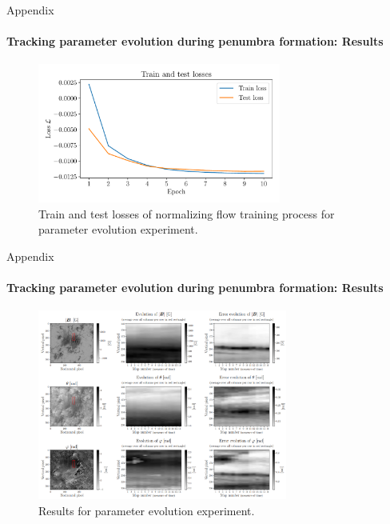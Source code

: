\documentclass{beamer}
\begin{document}
\begin{frame}[allowframebreaks]{Appendix}
	\framesubtitle{Tracking parameter evolution during penumbra formation: Results} %
	\begin{figure}[h!]
		\centering
		\includegraphics[width=8cm]{figures/thesis/nf-milne-eddington-example-7-loss-nflows-piecewisequadratic.pdf}
		\caption{Train and test losses of normalizing flow training process for parameter evolution experiment.}
		\label{fig:nf-milne-eddington-example-7-loss-nflows-piecewisequadratic}
	\end{figure}
\end{frame}

\begin{frame}[allowframebreaks]{Appendix}
	\framesubtitle{Tracking parameter evolution during penumbra formation: Results} %
	\vspace{-0.5cm}
	\begin{figure}[h!]
		\centering
		\includegraphics[width=8.2cm]{figures/presentation/exp6_fig1.png}
		\caption{Results for parameter evolution experiment.}
		\label{fig:exp6_fig1}
	\end{figure}
\end{frame}
\end{document}
